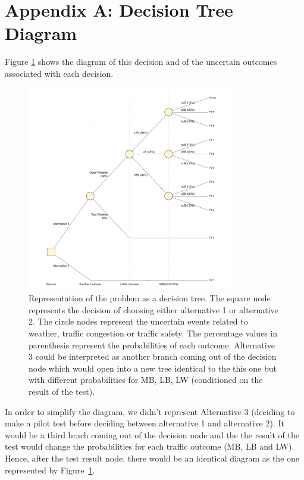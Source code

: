 \documentclass[11pt, letterpaper]{article}
\begin{document}
\begin{multicols}{2}
\printbibliography
\end{multicols}

\pagebreak
\section*{Appendix A: Decision Tree Diagram}

Figure \ref{decisiontree} shows the diagram of this decision and of the
uncertain outcomes associated with each decision.

\begin{figure}[H]
\centering
\includegraphics[width=0.8\textwidth]{../../R/decisiontree.png}
\caption{Representation of the problem as a decision tree. The square node represents the decision of choosing either alternative 1 or alternative 2. The circle nodes represent the uncertain events related to weather, traffic congestion or traffic safety. The percentage values in parenthesis represent the probabilities of each outcome. Alternative 3 could be interpreted as another branch coming out of the decision node which would open into a new tree identical to the this one but with different probabilities for MB, LB, LW (conditioned on the result of the test).}
\label{decisiontree}
\end{figure}

In order to simplify the diagram, we didn't represent Alternative 3 (deciding to make a pilot test before deciding between alternative 1 and alternative 2). It would be a third brach coming out of the decision node and the the result of the test would change the probabilities for each traffic outcome (MB, LB and LW). Hence, after the test result node, there would be an identical diagram as the one represented
by Figure~\ref{decisiontree}.
\end{document}
